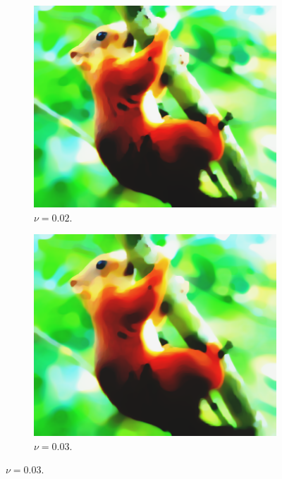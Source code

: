 \documentclass[abstracton]{scrreprt}
\begin{document}
\begin{figure}[!ht]
                \begin{subfigure}[b]{0.24\textwidth}
                    \includegraphics[width=\textwidth]{img/segmentation/cr/002squirrel.png}
                    \caption{$\nu = 0.02$.}
                \end{subfigure}
                \begin{subfigure}[b]{0.24\textwidth}
                    \includegraphics[width=\textwidth]{img/segmentation/cr/003squirrel.png}
                    \caption{$\nu = 0.03$.}
                \end{subfigure}

\end{figure}
\end{document}
